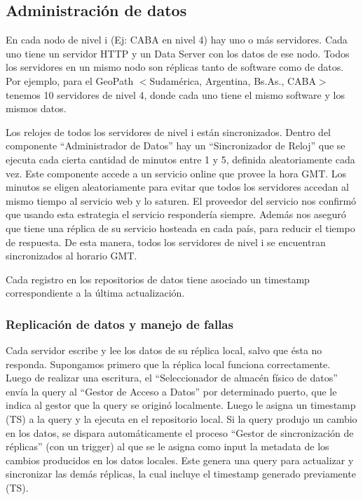 \subsection{Administración de datos} \label{seccionAdmDatos}


En cada nodo de nivel i (Ej: CABA en nivel 4) hay uno o más servidores. Cada uno tiene un servidor HTTP  y un Data Server con los datos de ese nodo. Todos los servidores en un mismo nodo son réplicas tanto de software como de datos. Por ejemplo, para el GeoPath $<$Sudamérica, Argentina, Bs.As., CABA$>$ tenemos 10 servidores de nivel 4, donde cada uno tiene el mismo software y los mismos datos.

Los relojes de todos los servidores de nivel i están sincronizados.
Dentro del componente ``Administrador de Datos'' hay un ``Sincronizador de Reloj'' que se ejecuta cada cierta cantidad de minutos entre 1 y 5, definida aleatoriamente cada vez. Este componente accede a un servicio online que provee la hora GMT. Los minutos se eligen aleatoriamente para evitar que todos los servidores accedan al mismo tiempo al servicio web y lo saturen. El proveedor del servicio nos confirmó que usando esta  estrategia el servicio respondería siempre. Además nos aseguró que tiene una réplica de su servicio hosteada en cada país, para reducir el tiempo de respuesta. De esta manera, todos los servidores de nivel i se encuentran sincronizados al horario GMT.

Cada registro en los repositorios de datos tiene asociado un timestamp correspondiente a la última actualización.

\subsubsection{Replicación de datos y manejo de fallas}

Cada servidor escribe y lee los datos de su réplica local, salvo que ésta no responda. Supongamos primero que la réplica local funciona correctamente. Luego de realizar una escritura, el “Seleccionador de almacén físico de datos” envía la query al “Gestor de Acceso a Datos” por determinado puerto, que le indica al gestor que la query se originó localmente. Luego le asigna un timestamp (TS) a la query y la ejecuta en el repositorio local. Si la query produjo un cambio en los datos, se dispara automáticamente el proceso “Gestor de sincronización de réplicas” (con un trigger) al que se le asigna como input la metadata de los cambios producidos en los datos locales. Este genera una query para actualizar y sincronizar las demás réplicas, la cual incluye el timestamp generado previamente (TS).

